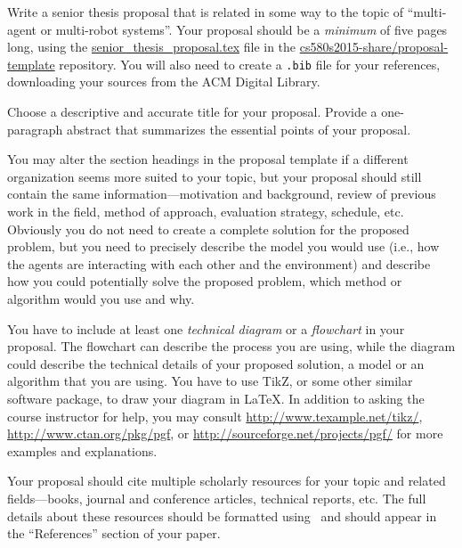 

\usepackage{ulem}
\usepackage[compact]{titlesec}




Write a senior thesis proposal that is related in some way to the topic of ``multi-agent or multi-robot systems''. Your
proposal should be a {\em minimum} of five pages long, using the \url{senior_thesis_proposal.tex} file in the
\url{cs580s2015-share/proposal-template} repository.  You will also need to create a {\tt .bib} file for
your references, downloading your sources from the ACM Digital Library.

Choose a descriptive and accurate title for your proposal. Provide a one-paragraph abstract that summarizes the
essential points of your proposal.

You may alter the section headings in the proposal template if a different organization seems more suited to your topic,
but your proposal should still contain the same information---motivation and background, review of previous work in the
field, method of approach, evaluation strategy, schedule, etc. Obviously you do not need to create a complete solution
for the proposed problem, but you need to precisely describe the model you would use (i.e., how the agents are
interacting with each other and the environment) and describe how you could potentially solve the proposed problem,
which method or algorithm would you use and why.

You have to include at least one {\em technical diagram} or a {\em flowchart} in your proposal. The flowchart can
describe the process you are using, while the diagram could describe the technical details of your proposed solution, a
model or an algorithm that you are using. You have to use TikZ, or some other similar software package, to draw your
diagram in \LaTeX. In addition to asking the course instructor for help, you may consult
\url{http://www.texample.net/tikz/}, \url{http://www.ctan.org/pkg/pgf}, or \url{http://sourceforge.net/projects/pgf/}
for more examples and explanations.

Your proposal should cite multiple scholarly resources for your topic and related fields---books, journal and conference
articles, technical reports, etc. The full details about these resources should be formatted using \BibTeX\ and should
appear in the ``References'' section of your paper.

